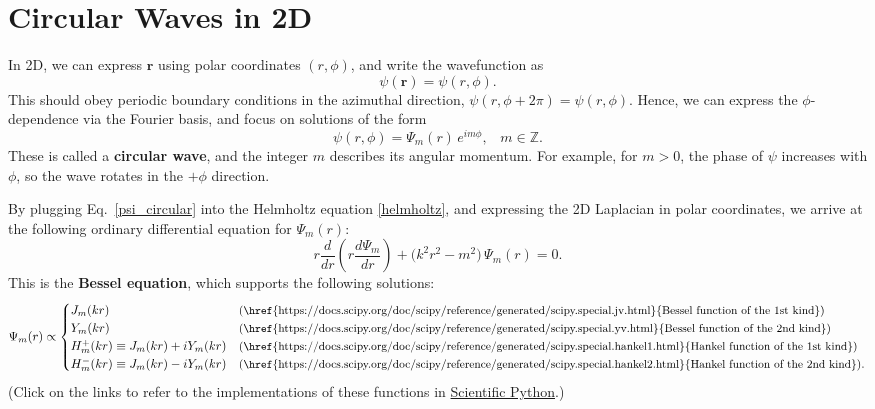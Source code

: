 \documentclass[prx,12pt]{revtex4-2}
\begin{document}
\section{Circular Waves in 2D}
\label{circular_waves}

In 2D, we can express $\mathbf{r}$ using polar coordinates $(r,
\phi)$, and write the wavefunction as
\begin{equation}
  \psi(\mathbf{r}) = \psi(r,\phi).
\end{equation}
This should obey periodic boundary conditions in the azimuthal
direction, $\psi(r,\phi + 2\pi) = \psi(r, \phi)$.  Hence, we can
express the $\phi$-dependence via the Fourier basis, and focus on
solutions of the form
\begin{equation}
  \psi(r,\phi) = \Psi_m(r)\, e^{im\phi}, \;\;\;m \in\mathbb{Z}.
  \label{psi_circular}
\end{equation}
These is called a \textbf{circular wave}, and the integer $m$
describes its angular momentum.  For example, for $m > 0$, the phase
of $\psi$ increases with $\phi$, so the wave rotates in the $+\phi$
direction.

By plugging Eq.~\eqref{psi_circular} into the Helmholtz equation
\eqref{helmholtz}, and expressing the 2D Laplacian in polar
coordinates, we arrive at the following ordinary differential equation
for $\Psi_m(r)$:
\begin{equation}
  r \frac{d}{dr}\!\left(r \frac{d\Psi_m}{dr} \right)
  + \Big(k^2 r^2 - m^2 \Big)\, \Psi_m(r) = 0.
  \label{besseleq}
\end{equation}
This is the \textbf{Bessel equation}, which supports the following
solutions:
\begin{equation}
  \Psi_m(r) \propto \begin{cases}
    J_m(kr) &\text{\small(\href{https://docs.scipy.org/doc/scipy/reference/generated/scipy.special.jv.html}{Bessel function of the 1st kind})} \\
    Y_m(kr) &\text{\small(\href{https://docs.scipy.org/doc/scipy/reference/generated/scipy.special.yv.html}{Bessel function of the 2nd kind})} \\
    H_m^+(kr) \equiv J_m(kr) + i Y_m(kr) &\text{\small(\href{https://docs.scipy.org/doc/scipy/reference/generated/scipy.special.hankel1.html}{Hankel function of the 1st kind})} \\
    H_m^-(kr) \equiv J_m(kr) - i Y_m(kr) &\text{\small(\href{https://docs.scipy.org/doc/scipy/reference/generated/scipy.special.hankel2.html}{Hankel function of the 2nd kind})}.
  \end{cases}
\end{equation}
(Click on the links to refer to the implementations of these functions
in \href{https://scipy.org/}{Scientific Python}.)
\end{document}

